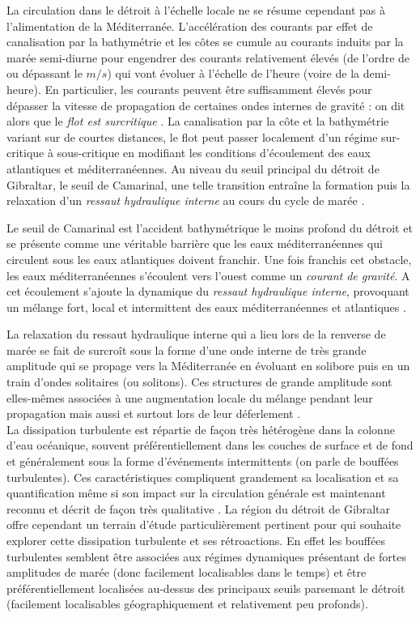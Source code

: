 La circulation dans le détroit à l'échelle locale ne se résume cependant pas à l'alimentation de la Méditerranée. L'accélération des courants par effet de canalisation par la bathymétrie et les côtes se cumule au courants induits par la marée semi-diurne pour engendrer des courants relativement élevés (de l'ordre de ou dépassant le $m/s$) qui vont évoluer à l'échelle de l'heure (voire de la demi-heure). En particulier, les courants peuvent être suffisamment élevés pour dépasser la vitesse de propagation de certaines ondes internes de gravité : on dit alors que le \textit{flot est surcritique} \citep{Baines1995}. La canalisation par la côte et la bathymétrie variant sur de courtes distances, le flot peut passer localement d'un régime sur-critique à sous-critique en modifiant les conditions d'écoulement des eaux atlantiques et méditerranéennes. Au niveau du seuil principal du détroit de Gibraltar, le seuil de Camarinal, une telle transition entraîne la formation puis la relaxation d'un \textit{ressaut hydraulique interne} au cours du cycle de marée \citep{FA1988}.

Le seuil de Camarinal est l'accident bathymétrique le moins profond du détroit et se présente comme une véritable barrière que les eaux méditerranéennes qui circulent sous les eaux atlantiques doivent franchir. Une fois franchis cet obstacle, les eaux méditerranéennes s'écoulent vers l'ouest comme un \textit{courant de gravité}. A cet écoulement s'ajoute la dynamique du \textit{ressaut hydraulique interne}, provoquant un mélange fort, local et intermittent des eaux méditerranéennes et atlantiques \citep{wesson_1994,GarciaLafuente2011}.

La relaxation du ressaut hydraulique interne qui a lieu lors de la renverse de marée se fait de surcroît sous la forme d'une onde interne de très grande amplitude qui se propage vers la Méditerranée en évoluant en solibore puis en un train d'ondes solitaires (ou solitons). Ces structures de grande amplitude sont elles-mêmes associées à une augmentation locale du mélange pendant leur propagation mais aussi et surtout lors de leur déferlement \citep{vlasenko_2009}. \\

La dissipation turbulente est répartie de façon très hétérogène dans la colonne d'eau océanique, souvent préférentiellement dans les couches de surface et de fond et généralement sous la forme d'événements intermittents (on parle de bouffées turbulentes). Ces caractéristiques compliquent grandement sa localisation et sa quantification même si son impact sur la circulation générale est maintenant reconnu et décrit de façon très qualitative \citep{de_lavergne_abyssal_2017}. 
La région du détroit de Gibraltar offre cependant un terrain d'étude particulièrement pertinent pour qui souhaite explorer cette dissipation turbulente et ses rétroactions. En effet les bouffées turbulentes semblent être associées aux régimes dynamiques présentant de fortes amplitudes de marée (donc facilement localisables dans le temps) et être préférentiellement localisées au-dessus des principaux seuils parsemant le détroit (facilement localisables géographiquement et relativement peu profonds).

